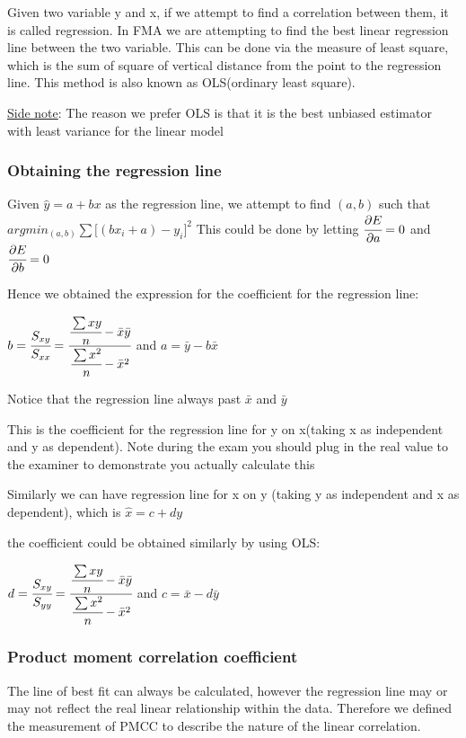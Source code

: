\documentclass[]{article}
\begin{document}
Given two variable y and x, if we attempt to find a correlation between
them, it is called regression. In FMA we are attempting to find the best
linear regression line between the two variable. This can be done via
the measure of least square, which is the sum of square of vertical
distance from the point to the regression line. This method is also
known as OLS(ordinary least square).

\href{}{Side note}: The reason we prefer OLS is that it is the best
unbiased estimator with least variance for the linear model

\subsubsection{Obtaining the regression line}\label{header-n385}

Given \(\hat{y} = a +bx\) as the regression line, we attempt to find
\((a,b)\) such that \(argmin_{(a,b)} \sum{[(b x_i + a)-y_i}]^2\) This
could be done by letting \(\cfrac{\partial E}{\partial a} = 0\) and
\(\cfrac{\partial E}{\partial b} = 0\)

Hence we obtained the expression for the coefficient for the regression
line:

\(b = \cfrac{S_{xy}}{S_{xx}} = \cfrac{\cfrac{\sum xy}{n} - \bar{x}\bar{y}}{\cfrac{\sum x^2}{n}-\bar{x}^2}\)
and \(a = \bar{y} - b\bar{x}\)

Notice that the regression line always past \(\bar{x}\) and \(\bar{y}\)

This is the coefficient for the regression line for y on x(taking x as
independent and y as dependent). Note during the exam you should plug in
the real value to the examiner to demonstrate you actually calculate
this

Similarly we can have regression line for x on y (taking y as
independent and x as dependent), which is \(\hat{x} = c + dy\)

the coefficient could be obtained similarly by using OLS:

\(d = \cfrac{S_{xy}}{S_{yy}} = \cfrac{\cfrac{\sum xy}{n} - \bar{x}\bar{y}}{\cfrac{\sum x^2}{n}-\bar{x}^2}\)
and \(c = \bar{x} - d\bar{y}\)

\subsubsection{Product moment correlation
coefficient}\label{header-n394}

The line of best fit can always be calculated, however the regression
line may or may not reflect the real linear relationship within the
data. Therefore we defined the measurement of PMCC to describe the
nature of the linear correlation.
\end{document}
